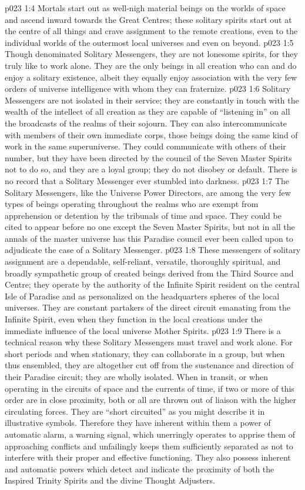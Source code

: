 \vs p023 1:4 Mortals start out as well\hyp{}nigh material beings on the worlds of space and ascend inward towards the Great Centres; these solitary spirits start out at the centre of all things and crave assignment to the remote creations, even to the individual worlds of the outermost local universes and even on beyond.
\vs p023 1:5 Though denominated Solitary Messengers, they are not lonesome spirits, for they truly like to work alone. They are the only beings in all creation who can and do enjoy a solitary existence, albeit they equally enjoy association with the very few orders of universe intelligence with whom they can fraternize.
\vs p023 1:6 \pc Solitary Messengers are not isolated in their service; they are constantly in touch with the wealth of the intellect of all creation as they are capable of “listening in” on all the broadcasts of the realms of their sojourn. They can also intercommunicate with members of their own immediate corps, those beings doing the same kind of work in the same superuniverse. They could communicate with others of their number, but they have been directed by the council of the Seven Master Spirits not to do so, and they are a loyal group; they do not disobey or default. There is no record that a Solitary Messenger ever stumbled into darkness.
\vs p023 1:7 The Solitary Messengers, like the Universe Power Directors, are among the very few types of beings operating throughout the realms who are exempt from apprehension or detention by the tribunals of time and space. They could be cited to appear before no one except the Seven Master Spirits, but not in all the annals of the master universe has this Paradise council ever been called upon to adjudicate the case of a Solitary Messenger.
\vs p023 1:8 These messengers of solitary assignment are a dependable, self\hyp{}reliant, versatile, thoroughly spiritual, and broadly sympathetic group of created beings derived from the Third Source and Centre; they operate by the authority of the Infinite Spirit resident on the central Isle of Paradise and as personalized on the headquarters spheres of the local universes. They are constant partakers of the direct circuit emanating from the Infinite Spirit, even when they function in the local creations under the immediate influence of the local universe Mother Spirits.
\vs p023 1:9 \pc There is a technical reason why these Solitary Messengers must travel and work alone. For short periods and when stationary, they can collaborate in a group, but when thus ensembled, they are altogether cut off from the sustenance and direction of their Paradise circuit; they are wholly isolated. When in transit, or when operating in the circuits of space and the currents of time, if two or more of this order are in close proximity, both or all are thrown out of liaison with the higher circulating forces. They are “short circuited” as you might describe it in illustrative symbols. Therefore they have inherent within them a power of automatic alarm, a warning signal, which unerringly operates to apprise them of approaching conflicts and unfailingly keeps them sufficiently separated as not to interfere with their proper and effective functioning. They also possess inherent and automatic powers which detect and indicate the proximity of both the Inspired Trinity Spirits and the divine Thought Adjusters.
